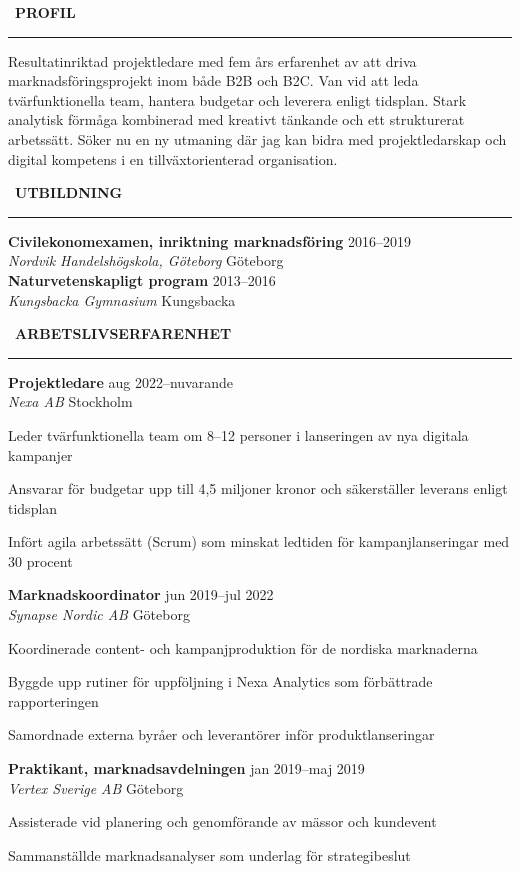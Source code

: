 \documentclass[10pt,a4paper]{article}
\newcommand{\mainhead}[2]{%
  \vspace{1pt}
  {\large\textcolor{primary}{#1}\ \textbf{\textcolor{primary}{#2}}}\par
  \vspace{1pt}\textcolor{accent}{\rule{\linewidth}{1pt}}
  \vspace{2pt}
}
\newcommand{\jobentry}[4]{%
  \vspace{-2pt}
  \textbf{\small #1} \hfill \textcolor{textgray}{\footnotesize #3}\\
  \textit{\footnotesize #2} \hfill \textcolor{textgray}{\footnotesize #4}\\[0pt]
}
\newcommand{\eduentry}[4]{%
  \textbf{\small #1} \hfill \textcolor{textgray}{\footnotesize #3}\\
  \textit{\footnotesize #2} \hfill \textcolor{textgray}{\footnotesize #4}\\[1pt]
}
\begin{document}
\begin{minipage}[t]{0.60\textwidth}
\small

\mainhead{\faUser}{PROFIL}
\footnotesize Resultatinriktad projektledare med fem års erfarenhet av att driva marknadsföringsprojekt
inom både B2B och B2C. Van vid att leda tvärfunktionella team, hantera budgetar och leverera
enligt tidsplan. Stark analytisk förmåga kombinerad med kreativt tänkande och ett strukturerat
arbetssätt. Söker nu en ny utmaning där jag kan bidra med projektledarskap och digital
kompetens i en tillväxtorienterad organisation.
\small

\mainhead{\faGraduationCap}{UTBILDNING}

\eduentry{Civilekonomexamen, inriktning marknadsföring}{Nordvik Handelshögskola, Göteborg}{2016--2019}{Göteborg}

\eduentry{Naturvetenskapligt program}{Kungsbacka Gymnasium}{2013--2016}{Kungsbacka}
\vspace{-4pt}

\mainhead{\faBriefcase}{ARBETSLIVSERFARENHET}

\jobentry{Projektledare}{Nexa AB}{aug 2022--nuvarande}{Stockholm}
\begin{cvitems}
  \item Leder tvärfunktionella team om 8--12 personer i lanseringen av nya digitala kampanjer
  \item Ansvarar för budgetar upp till 4,5 miljoner kronor och säkerställer leverans enligt tidsplan
  \item Infört agila arbetssätt (Scrum) som minskat ledtiden för kampanjlanseringar med 30 procent
\end{cvitems}

\jobentry{Marknadskoordinator}{Synapse Nordic AB}{jun 2019--jul 2022}{Göteborg}
\begin{cvitems}
  \item Koordinerade content- och kampanjproduktion för de nordiska marknaderna
  \item Byggde upp rutiner för uppföljning i Nexa Analytics som förbättrade rapporteringen
  \item Samordnade externa byråer och leverantörer inför produktlanseringar
\end{cvitems}

\jobentry{Praktikant, marknadsavdelningen}{Vertex Sverige AB}{jan 2019--maj 2019}{Göteborg}
\begin{cvitems}
  \item Assisterade vid planering och genomförande av mässor och kundevent
  \item Sammanställde marknadsanalyser som underlag för strategibeslut
\end{cvitems}

\end{minipage}
\end{document}
